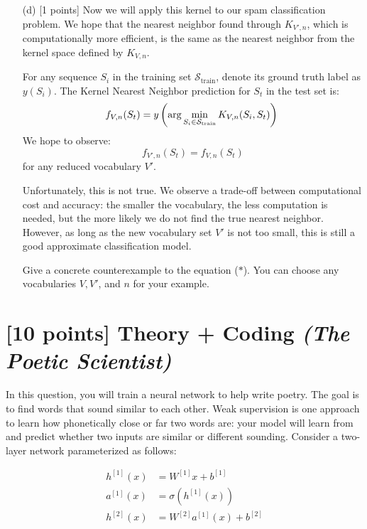 \documentclass{article}
\newif\ifsolutions
\newenvironment{labelledanswer}{{\bf Answer:} \sf }{}%
\newcommand{\answer}[2]
{{
\ifsolutions
\begin{labelledanswer}
\color{red} 
#2
\end{labelledanswer}
\else
#1
\fi
}}
\begin{document}
\begin{itemize}
    \answer{}{}
    
    \item[(d)] [1 points] Now we will apply this kernel to our spam classification problem. We hope that the nearest neighbor found through $K_{V', n}$, which is computationally more efficient, is the same as the nearest neighbor from the kernel space defined by $K_{V, n}$. 
    
    For any sequence $S_i$ in the training set $\mathcal{S}_{\text{train}}$, denote its ground truth label as $y(S_i)$. The Kernel Nearest Neighbor prediction for $S_t$ in the test set is:
    \[
        f_{V, n}(S_t) = y\left(\text{arg} \min_{S_i \in \mathcal{S}_{\text{train}}}  K_{V, n}(S_i, S_t)\right)\\
    \]
    We hope to observe:
    \[
        f_{V', n}(S_t) = f_{V, n}(S_t)  \tag{$\ast$} \label{eq:star}
    \]
    for any reduced vocabulary $V'$.
    
    Unfortunately, this is not true. We observe a trade-off between computational cost and accuracy: the smaller the vocabulary, the less computation is needed, but the more likely we do not find the true nearest neighbor. However, as long as the new vocabulary set $V'$ is not too small, this is still a good approximate classification model. 
    
    Give a concrete counterexample to the equation ($*$). You can choose any vocabularies $V, V'$, and $n$ for your example.
    
    \answer{}{}
    
\end{itemize} 

\clearpage 

\section{[10 points] Theory + Coding  \it{(The Poetic Scientist)}}

In this question, you will train a neural network to help write poetry. The goal is to find words that sound similar to each other. Weak supervision is one approach to learn how phonetically close or far two words are: your model will learn from and predict whether two inputs are similar or different sounding. Consider a two-layer network parameterized as follows:

\begin{align}
    h^{[1]}(x) &= W^{[1]}x + b^{[1]}\\
    a^{[1]}(x) &= \sigma(h^{[1]}(x))\\
    h^{[2]}(x) &= W^{[2]}a^{[1]}(x) + b^{[2]}
\end{align}
\end{document}
